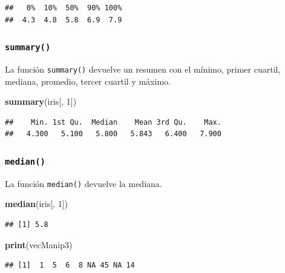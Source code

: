 \documentclass[]{book}
\newenvironment{Shaded}{\begin{snugshade}}{\end{snugshade}}
\newcommand{\KeywordTok}[1]{\textcolor[rgb]{0.13,0.29,0.53}{\textbf{#1}}}
\newcommand{\DecValTok}[1]{\textcolor[rgb]{0.00,0.00,0.81}{#1}}
\newcommand{\NormalTok}[1]{#1}
\begin{document}
\begin{verbatim}
##   0%  10%  50%  90% 100% 
##  4.3  4.8  5.8  6.9  7.9
\end{verbatim}

\subsubsection{\texorpdfstring{\texttt{summary()}}{summary()}}\label{l015summary}

La función \texttt{summary()} devuelve un resumen con el mínimo, primer
cuartil, mediana, promedio, tercer cuartil y máximo.

\begin{Shaded}
\begin{Highlighting}[]
\KeywordTok{summary}\NormalTok{(iris[, }\DecValTok{1}\NormalTok{])}
\end{Highlighting}
\end{Shaded}

\begin{verbatim}
##    Min. 1st Qu.  Median    Mean 3rd Qu.    Max. 
##   4.300   5.100   5.800   5.843   6.400   7.900
\end{verbatim}

\subsubsection{\texorpdfstring{\texttt{median()}}{median()}}\label{l015median}

La función \texttt{median()} devuelve la mediana.

\begin{Shaded}
\begin{Highlighting}[]
\KeywordTok{median}\NormalTok{(iris[, }\DecValTok{1}\NormalTok{])}
\end{Highlighting}
\end{Shaded}

\begin{verbatim}
## [1] 5.8
\end{verbatim}

\begin{Shaded}
\begin{Highlighting}[]
\KeywordTok{print}\NormalTok{(vecManip3)}
\end{Highlighting}
\end{Shaded}

\begin{verbatim}
## [1]  1  5  6  8 NA 45 NA 14
\end{verbatim}
\end{document}
